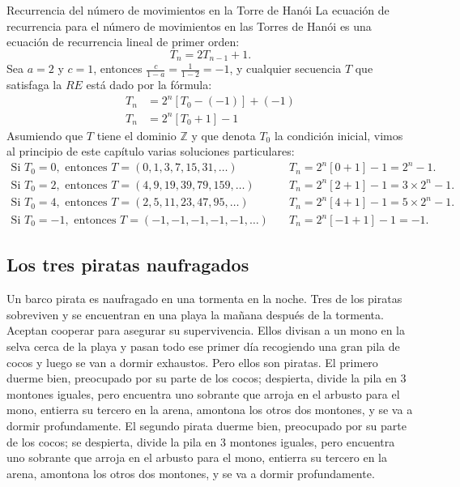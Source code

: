 \begin{example}{Recurrencia del número de movimientos en la Torre de Hanói}
	La ecuación de recurrencia para el número de movimientos en las Torres de Hanói es una ecuación de recurrencia lineal de primer orden:
	\begin{equation*}
	T_{n}=2T_{n-1}+1.
	\end{equation*}
	Sea $a=2$ y $c=1$, entonces $\frac{c}{1-a}=\frac{1}{1-2}=-1$, y cualquier secuencia $T$ que satisfaga la $RE$ está dado por la fórmula:
	\begin{align*}
	T_{n}&=2^{n}\left[T_{0}-(-1)\right]+(-1)\\
	T_{n}&=2^{n}\left[T_{0}+1\right]-1
	\end{align*}
	Asumiendo que $T$ tiene el dominio $\mathds{Z}$ y que denota $T_0$ la condición inicial, vimos al principio de este capítulo varias soluciones particulares:
	\begin{align*}
		\text{Si }T_{0}=0,\text{ entonces }T=\left(0,1,3,7,15,31,\ldots\right)\quad &T_{n}=2^{n}[0+1]-1=2^n-1.\\
		\text{Si }T_{0}=2,\text{ entonces }T=\left(4,9,19,39,79,159,\ldots\right)\quad &T_{n}=2^{n}[2+1]-1=3\times2^{n}-1.\\
		\text{Si }T_{0}=4,\text{ entonces }T=\left(2,5,11,23,47,95,\ldots\right)\quad &T_{n}=2^{n}[4+1]-1=5\times2^{n}-1.\\
		\text{Si }T_{0}=-1,\text{ entonces }T=\left(-1,-1,-1,-1,-1,\ldots\right)\quad &T_{n}=2^{n}\left[-1+1\right]-1=-1.
	\end{align*}
\end{example}

\subsection{Los tres piratas naufragados}

Un barco pirata es naufragado en una tormenta en la noche. Tres de los piratas sobreviven y se encuentran en una playa la mañana después de la tormenta. Aceptan cooperar para asegurar su supervivencia. Ellos divisan a un mono en la selva cerca de la playa y pasan todo ese primer día recogiendo una gran pila de cocos y luego se van a dormir exhaustos. Pero ellos son piratas. El primero duerme bien, preocupado por su parte de los cocos; despierta, divide la pila en 3 montones iguales, pero encuentra uno sobrante que arroja en el arbusto para el mono, entierra su tercero en la arena, amontona los otros dos montones, y se va a dormir profundamente. El segundo pirata duerme bien, preocupado por su parte de los cocos; se despierta, divide la pila en 3 montones iguales, pero encuentra uno sobrante que arroja en el arbusto para el mono, entierra su tercero en la arena, amontona los otros dos montones, y se va a dormir profundamente.

